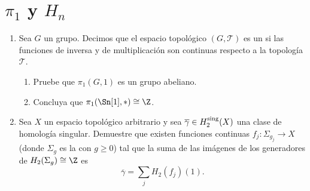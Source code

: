 \documentclass[11pt, reqno]{amsart}
\begin{document}
\section{$\pi_1$ y $H_n$}
\begin{enumerate}[resume]
	\item Sea $G$ un grupo.
		Decimos que el espacio topológico $(G, \mathcal{T})$ es un  si las funciones de inversa y de
		multiplicación son continuas respecto a la topología $\mathcal{T}$.
		\begin{enumerate}
			\item Pruebe que $\pi_1(G, 1)$ es un grupo abeliano.
			\item Concluya que $\pi_1(\Sn[1], *) \cong \Z$.
		\end{enumerate}

	\item\lookst
		Sea $X$ un espacio topológico arbitrario y sea $\overline{\gamma} \in H_2^{\rm sing}(X)$ una clase de homología singular.
		Demuestre que existen funciones continuas $f_j\colon \Sigma_{g_j} \to X$ (donde $\Sigma_g$ es la  con $g \ge 0$) tal que la suma de las imágenes de los generadores de $H_2(\Sigma_g) \cong \Z$ es
		\[
			\overline{\gamma} = \sum_j H_2(f_j)(1).
		\]
\end{enumerate}

\appendix
\end{document}
